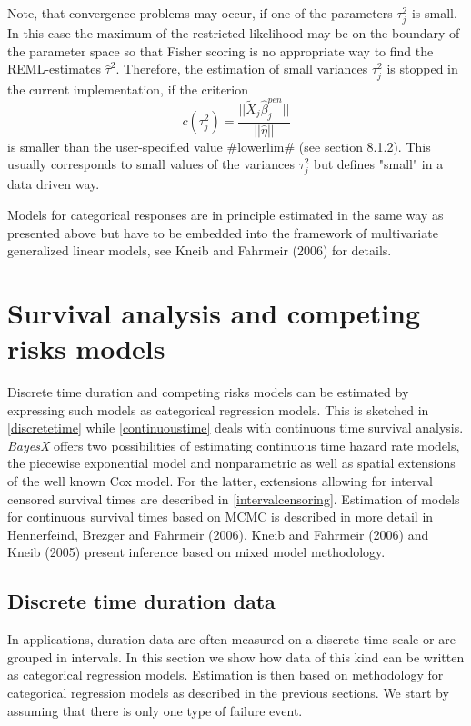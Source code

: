 \documentclass[11pt,a4paper,twoside]{bayesxarticle}
\begin{document}
Note, that convergence problems may occur, if one of the
parameters $\tau_j^2$ is small. In this case the maximum of the
restricted likelihood may be on the boundary of the parameter
space so that Fisher scoring is no appropriate way to find the
REML-estimates $\hat{\tau}^2$. Therefore, the estimation of small
variances $\tau_j^2$ is stopped in the current implementation, if
the criterion
\begin{equation}\label{remlstopcrit}
 c(\tau_j^2)=\frac{||\tilde{X}_j\hat{\beta}_j^{pen}||}{||\hat{\eta}||}
\end{equation}
is smaller than the user-specified value #lowerlim# (see section
8.1.2). This usually corresponds to small values of the variances
$\tau_j^2$ but defines "small" in a data driven way.

Models for categorical responses are in principle estimated in the
same way as presented above but have to be embedded into the
framework of multivariate generalized linear models, see Kneib and
Fahrmeir (2006) for details.

\section{Survival analysis and competing risks models}
\label{survivalAnalysis}

Discrete time duration and competing risks models can be estimated
by expressing such models as categorical regression models. This is
sketched in \autoref{discretetime} while \autoref{continuoustime}
deals with continuous time survival analysis. \textit{BayesX} offers
two possibilities of estimating continuous time hazard rate models,
the piecewise exponential model and nonparametric as well as spatial
extensions of the well known Cox model. For the latter, extensions
allowing for interval censored survival times are described in
\autoref{intervalcensoring}. Estimation of models for continuous
survival times based on MCMC is described in more detail in
Hennerfeind, Brezger and Fahrmeir (2006). Kneib and Fahrmeir (2006)
and Kneib (2005) present inference based on mixed model methodology.


\subsection{Discrete time duration data}
\label{discretetime}

In applications, duration data are often measured on a discrete
time scale or are grouped in intervals. In this section we show
how data of this kind can be written as categorical regression
models.  Estimation is then based on methodology for categorical
regression models as described in the previous sections. We start
by assuming that there is only one type of failure event.
\end{document}

